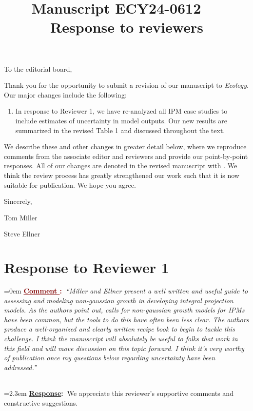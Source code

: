 \documentclass[12pt]{article}
\newcounter{cN}
\newcommand{\comment}[1]{
	\vspace{2em}
	\refstepcounter{cN} %
	\noindent \hangindent=0em \textbf{\textcolor{Maroon}{\uline{Comment \thecN}:~}}\emph{``#1''}
	}
\newcommand{\response}[1]{
	\\[0.25em]
	\hangindent=2.3em \textbf{\textcolor{NavyBlue}{\uline{Response}:~}}#1
	}
\newcommand{\revise}[1]{{\color{Mahogany}{#1}}}
\begin{document}
\title{Manuscript ECY24-0612 --- Response to reviewers}

\maketitle
\noindent To the editorial board,

Thank you for the opportunity to submit a revision of our manuscript to \emph{Ecology}. Our major changes include the following:
\begin{enumerate}
	\item In response to Reviewer 1, we have re-analyzed all IPM case studies to include estimates of uncertainty in model outputs. Our new results are summarized in the revised Table 1 and discussed throughout the text. 

\end{enumerate}

We describe these and other changes in greater detail below, where we reproduce comments from the associate editor and reviewers and provide our point-by-point responses. 
All of our changes are denoted in the revised manuscript with \revise{Mahogany font}. 
We think the review process has greatly strengthened our work such that it is now suitable for publication.
We hope you agree. 

\vspace{2em}
Sincerely,

Tom Miller

Steve Ellner

\newpage

\section{Response to Reviewer 1}
\vspace{-2em}

\comment{Miller and Ellner present a well written and useful guide to assessing and modeling non-gaussian growth in developing integral projection models. As the authors point out, calls for non-gaussian growth models for IPMs have been common, but the tools to do this have often been less clear. The authors produce a well-organized and clearly written recipe book to begin to tackle this challenge. I think the manuscript will absolutely be useful to folks that work in this field and will move discussion on this topic forward. I think it’s very worthy of publication once my questions below regarding uncertainty have been addressed.}
\response{We appreciate this reviewer's supportive comments and constructive suggestions.}
\end{document}
